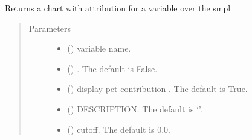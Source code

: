 \documentclass[letterpaper,10pt,english]{sphinxmanual}
\begin{document}
\begin{fulllineitems}
\begin{fulllineitems}
\label{\detokenize{core/modelclass:modelclass.Dekomp_Mixin.dekomp_plot}}
\pysigstartsignatures
{}
\pysigstopsignatures
\sphinxAtStartPar
Returns  a chart with attribution for a variable over the smpl
\begin{quote}\begin{description}
\item[{Parameters}] \leavevmode\begin{itemize}
\item {} 
\sphinxAtStartPar
{} () \textendash{} variable name.

\item {} 
\sphinxAtStartPar
{} (\sphinxstyleliteralemphasis{\sphinxupquote{, }}) \textendash{} . The default is False.

\item {} 
\sphinxAtStartPar
{} (\sphinxstyleliteralemphasis{\sphinxupquote{, }}) \textendash{} display pct contribution . The default is True.

\item {} 
\sphinxAtStartPar
{} (\sphinxstyleliteralemphasis{\sphinxupquote{, }}) \textendash{} DESCRIPTION. The default is ‘’.

\item {} 
\sphinxAtStartPar
{} (\sphinxstyleliteralemphasis{\sphinxupquote{, }}) \textendash{} cutoff. The default is 0.0.


\end{itemize}
\end{description}
\end{quote}
\end{fulllineitems}
\end{fulllineitems}
\end{document}
